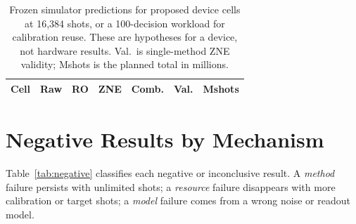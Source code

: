 \documentclass[10pt,twocolumn]{article}
\begin{document}
\begin{table}[t]
\centering
\caption{Frozen simulator predictions for proposed device cells at 16,384 shots, or a 100-decision
workload for calibration reuse. These are hypotheses for a device, not hardware results. Val.\ is
single-method ZNE validity; Mshots is the planned total in millions.}
\label{tab:hardware}
\footnotesize
\setlength{\tabcolsep}{2.4pt}
\begin{tabular}{lrrrrlr}
\toprule
Cell & Raw & RO & ZNE & Comb. & Val. & Mshots\\
\midrule

\end{tabular}
\end{table}

\section{Negative Results by Mechanism}
\label{sec:negative}
Table~\ref{tab:negative} classifies each negative or inconclusive result. A \emph{method} failure
persists with unlimited shots; a \emph{resource} failure disappears with more calibration or target
shots; a \emph{model} failure comes from a wrong noise or readout model.
\end{document}
